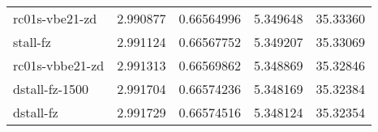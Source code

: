 \begin{table}
\begin{tabular}{|l|l|l|l|l|}
		\rowcolor{lightgray}
      rc01s-vbe21-zd    &2.990877  & 0.66564996 & 5.349648 & 35.33360\\
		\rowcolor{lightgray}
           stall-fz    &2.991124  & 0.66567752 & 5.349207 & 35.33069\\
		\rowcolor{lightgray}
    rc01s-vbbe21-zd    &2.991313  & 0.66569862 & 5.348869 & 35.32846\\
		\rowcolor{lightgray}
     dstall-fz-1500    &2.991704  & 0.66574236 & 5.348169 & 35.32384\\
		\rowcolor{lightgray}
          dstall-fz    &2.991729  & 0.66574516 & 5.348124 & 35.32354\\
	\hline
    \end{tabular}
\end{table}
